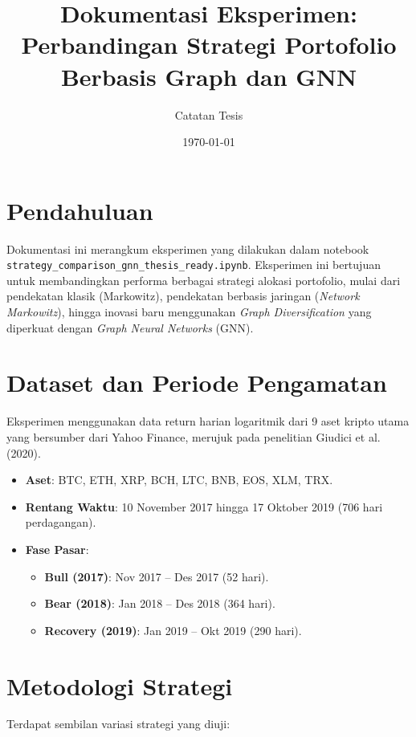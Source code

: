 \documentclass[12pt,a4paper]{article}
\title{Dokumentasi Eksperimen: Perbandingan Strategi Portofolio Berbasis Graph dan GNN}
\author{Catatan Tesis}
\date{\today}
\begin{document}
\maketitle

\section{Pendahuluan}
Dokumentasi ini merangkum eksperimen yang dilakukan dalam notebook \texttt{strategy\_comparison\_gnn\_thesis\_ready.ipynb}. Eksperimen ini bertujuan untuk membandingkan performa berbagai strategi alokasi portofolio, mulai dari pendekatan klasik (Markowitz), pendekatan berbasis jaringan (\textit{Network Markowitz}), hingga inovasi baru menggunakan \textit{Graph Diversification} yang diperkuat dengan \textit{Graph Neural Networks} (GNN).

\section{Dataset dan Periode Pengamatan}
Eksperimen menggunakan data return harian logaritmik dari 9 aset kripto utama yang bersumber dari Yahoo Finance, merujuk pada penelitian Giudici et al. (2020).

\begin{itemize}
    \item \textbf{Aset}: BTC, ETH, XRP, BCH, LTC, BNB, EOS, XLM, TRX.
    \item \textbf{Rentang Waktu}: 10 November 2017 hingga 17 Oktober 2019 (706 hari perdagangan).
    \item \textbf{Fase Pasar}:
    \begin{itemize}
        \item \textbf{Bull (2017)}: Nov 2017 -- Des 2017 (52 hari).
        \item \textbf{Bear (2018)}: Jan 2018 -- Des 2018 (364 hari).
        \item \textbf{Recovery (2019)}: Jan 2019 -- Okt 2019 (290 hari).
    \end{itemize}
\end{itemize}

\section{Metodologi Strategi}
Terdapat sembilan variasi strategi yang diuji:
\end{document}
